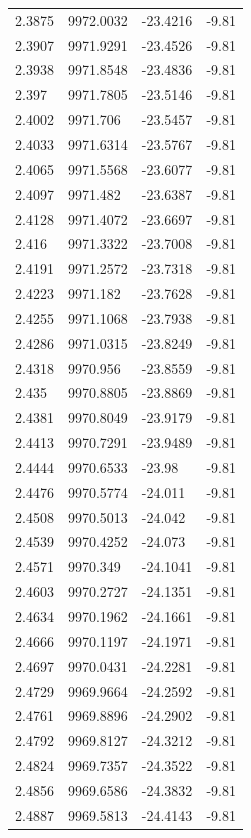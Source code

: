 \begin{table}[H]
\begin{tabular}{llll}
2.3875 & 9972.0032 & -23.4216 & -9.81 \\
2.3907 & 9971.9291 & -23.4526 & -9.81 \\
2.3938 & 9971.8548 & -23.4836 & -9.81 \\
2.397 & 9971.7805 & -23.5146 & -9.81 \\
2.4002 & 9971.706 & -23.5457 & -9.81 \\
2.4033 & 9971.6314 & -23.5767 & -9.81 \\
2.4065 & 9971.5568 & -23.6077 & -9.81 \\
2.4097 & 9971.482 & -23.6387 & -9.81 \\
2.4128 & 9971.4072 & -23.6697 & -9.81 \\
2.416 & 9971.3322 & -23.7008 & -9.81 \\
2.4191 & 9971.2572 & -23.7318 & -9.81 \\
2.4223 & 9971.182 & -23.7628 & -9.81 \\
2.4255 & 9971.1068 & -23.7938 & -9.81 \\
2.4286 & 9971.0315 & -23.8249 & -9.81 \\
2.4318 & 9970.956 & -23.8559 & -9.81 \\
2.435 & 9970.8805 & -23.8869 & -9.81 \\
2.4381 & 9970.8049 & -23.9179 & -9.81 \\
2.4413 & 9970.7291 & -23.9489 & -9.81 \\
2.4444 & 9970.6533 & -23.98 & -9.81 \\
2.4476 & 9970.5774 & -24.011 & -9.81 \\
2.4508 & 9970.5013 & -24.042 & -9.81 \\
2.4539 & 9970.4252 & -24.073 & -9.81 \\
2.4571 & 9970.349 & -24.1041 & -9.81 \\
2.4603 & 9970.2727 & -24.1351 & -9.81 \\
2.4634 & 9970.1962 & -24.1661 & -9.81 \\
2.4666 & 9970.1197 & -24.1971 & -9.81 \\
2.4697 & 9970.0431 & -24.2281 & -9.81 \\
2.4729 & 9969.9664 & -24.2592 & -9.81 \\
2.4761 & 9969.8896 & -24.2902 & -9.81 \\
2.4792 & 9969.8127 & -24.3212 & -9.81 \\
2.4824 & 9969.7357 & -24.3522 & -9.81 \\
2.4856 & 9969.6586 & -24.3832 & -9.81 \\
2.4887 & 9969.5813 & -24.4143 & -9.81 \\

\end{tabular}
\end{table}
